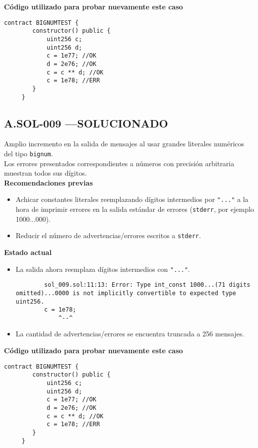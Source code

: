 \textbf{Código utilizado para probar nuevamente este caso}
\begin{lstlisting}[language=Solidity]
    contract BIGNUMTEST {
        constructor() public {
            uint256 c;
            uint256 d;
            c = 1e77; //OK
            d = 2e76; //OK
            c = c ** d; //OK
            c = 1e78; //ERR
        }
     }     
\end{lstlisting}


\subsection*{A.SOL-009  \color{ForestGreen}—SOLUCIONADO}
Amplio incremento en la salida de mensajes al usar grandes literales numéricos del tipo \texttt{bignum}.\\

Los errores presentados correspondientes a números con precisión arbitraria muestran todos sus dígitos.\\

\textbf{Recomendaciones previas}
\begin{itemize}
    \item Achicar constantes literales reemplazando dígitos intermedios por \texttt{"..."} a la hora de imprimir errores en la salida estándar de errores (\texttt{stderr}, por ejemplo 1000...000).
    \item Reducir el número de advertencias/errores escritos a \texttt{stderr}.
\end{itemize}
\bigskip

\textbf{Estado actual}
\begin{itemize}
    \item La salida ahora reemplaza dígitos intermedios con \texttt{"..."}.
    \begin{lstlisting}
        sol_009.sol:11:13: Error: Type int_const 1000...(71 digits omitted)...0000 is not implicitly convertible to expected type uint256.
        c = 1e78;
            ^--^
    \end{lstlisting}
    \item La cantidad de advertencias/errores se encuentra truncada a 256 mensajes.
\end{itemize}
\bigskip

\textbf{Código utilizado para probar nuevamente este caso}
\begin{lstlisting}[language=Solidity]
    contract BIGNUMTEST {
        constructor() public {
            uint256 c;
            uint256 d;
            c = 1e77; //OK
            d = 2e76; //OK
            c = c ** d; //OK
            c = 1e78; //ERR
        }
     }     
\end{lstlisting}


